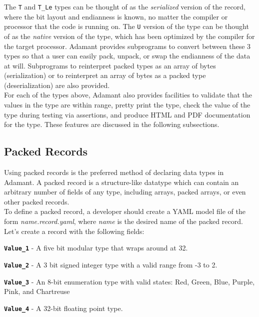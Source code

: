 The \texttt{T} and \texttt{T\_Le} types can be thought of as the \textit{serialized} version of the record, where the bit layout and endianness is known, no matter the compiler or processor that the code is running on. The \texttt{U} version of the type can be thought of as the \textit{native} version of the type, which has been optimized by the compiler for the target processor. Adamant provides subprograms to convert between these 3 types so that a user can easily pack, unpack, or swap the endianness of the data at will. Subprograms to reinterpret packed types as an array of bytes (serialization) or to reinterpret an array of bytes as a packed type (deserialization) are also provided. \\

For each of the types above, Adamant also provides facilities to validate that the values in the type are within range, pretty print the type, check the value of the type during testing via assertions, and produce HTML and PDF documentation for the type. These features are discussed in the following subsections.

\subsection{Packed Records} \label{Packed Records}

Using packed records is the preferred method of declaring data types in Adamant. A packed record is a structure-like datatype which can contain an arbitrary number of fields of any type, including arrays, packed arrays, or even other packed records. \\

To define a packed record, a developer should create a YAML model file of the form \textit{name.record.yaml}, where \textit{name} is the desired name of the packed record. Let's create a record with the following fields:

\vspace{5mm} %
\begin{spaceditemize}
  \item \textbf{\texttt{Value\_1}} - A five bit modular type that wraps around at 32.
  \item \textbf{\texttt{Value\_2}} - A 3 bit signed integer type with a valid range from -3 to 2.
  \item \textbf{\texttt{Value\_3}} - An 8-bit enumeration type with valid states: Red, Green, Blue, Purple, Pink, and Chartreuse
  \item \textbf{\texttt{Value\_4}} - A 32-bit floating point type.
\end{spaceditemize}
\vspace{5mm} %

